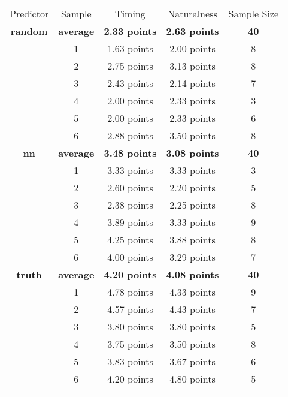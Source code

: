 \begin{tabular}{ccccc}
\hline\noalign{\smallskip}
Predictor & Sample & Timing & Naturalness & Sample Size \\
\noalign{\smallskip}\svhline\noalign{\smallskip}
\bf{random} & \bf{average} & \bf{2.33 points} & \bf{2.63 points} & \bf{40} \\
& 1 & 1.63 points & 2.00 points & 8 \\
& 2 & 2.75 points & 3.13 points & 8 \\
& 3 & 2.43 points & 2.14 points & 7 \\
& 4 & 2.00 points & 2.33 points & 3 \\
& 5 & 2.00 points & 2.33 points & 6 \\
& 6 & 2.88 points & 3.50 points & 8 \\
\noalign{\smallskip}\hline\noalign{\smallskip}
\bf{nn} & \bf{average} & \bf{3.48 points} & \bf{3.08 points} & \bf{40} \\
& 1 & 3.33 points & 3.33 points & 3 \\
& 2 & 2.60 points & 2.20 points & 5 \\
& 3 & 2.38 points & 2.25 points & 8 \\
& 4 & 3.89 points & 3.33 points & 9 \\
& 5 & 4.25 points & 3.88 points & 8 \\
& 6 & 4.00 points & 3.29 points & 7 \\
\noalign{\smallskip}\hline\noalign{\smallskip}
\bf{truth} & \bf{average} & \bf{4.20 points} & \bf{4.08 points} & \bf{40} \\
& 1 & 4.78 points & 4.33 points & 9 \\
& 2 & 4.57 points & 4.43 points & 7 \\
& 3 & 3.80 points & 3.80 points & 5 \\
& 4 & 3.75 points & 3.50 points & 8 \\
& 5 & 3.83 points & 3.67 points & 6 \\
& 6 & 4.20 points & 4.80 points & 5 \\
\noalign{\smallskip}\hline\noalign{\smallskip}
\end{tabular}

